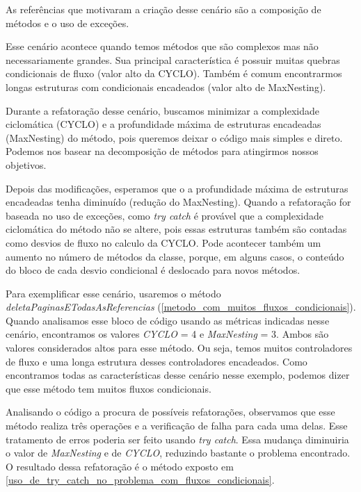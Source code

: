 	As referências que motivaram a criação desse cenário são a composição de métodos e o uso de exceções.
	
	Esse cenário acontece quando temos métodos que são complexos mas não necessariamente grandes. Sua principal característica é possuir muitas quebras condicionais de fluxo (valor alto da CYCLO). Também é comum encontrarmos longas estruturas com condicionais encadeados (valor alto de MaxNesting).
	
	Durante a refatoração desse cenário, buscamos minimizar a complexidade ciclomática (CYCLO) e a profundidade máxima de estruturas encadeadas (MaxNesting) do método, pois queremos deixar o código mais simples e direto. Podemos nos basear na decomposição de métodos para atingirmos nossos objetivos.
	
	Depois das modificações, esperamos que o a profundidade máxima de estruturas encadeadas tenha diminuído (redução do MaxNesting). Quando a refatoração for baseada no uso de exceções, como \textit{try catch} é provável que a complexidade ciclomática do método não se altere, pois essas estruturas também são contadas como desvios de fluxo no calculo da CYCLO. Pode acontecer também um aumento no número de métodos da classe, porque, em alguns casos, o conteúdo do bloco de cada desvio condicional é deslocado para novos métodos. 
           
	Para exemplificar esse cenário, usaremos o método \textit{deletaPaginasETodasAsReferencias} (\ref{metodo_com_muitos_fluxos_condicionais}). Quando analisamos esse bloco de código usando as métricas indicadas nesse cenário, encontramos os valores \textit{CYCLO} = 4 e \textit{MaxNesting} = 3. Ambos são valores considerados altos para esse método. Ou seja, temos muitos controladores de fluxo e uma longa estrutura desses controladores encadeados. Como encontramos todas as características desse cenário nesse exemplo, podemos dizer que esse método tem muitos fluxos condicionais. 
	
               

	Analisando o código a procura de possíveis refatorações, observamos que esse método realiza três operações e a verificação de falha para cada uma delas. Esse tratamento de erros poderia ser feito usando \textit{try catch}. Essa mudança diminuiria o valor de \textit{MaxNesting} e de \textit{CYCLO}, reduzindo bastante o problema encontrado. O resultado dessa refatoração é o método exposto em \ref{uso_de_try_catch_no_problema_com_fluxos_condicionais}.
                                                         
